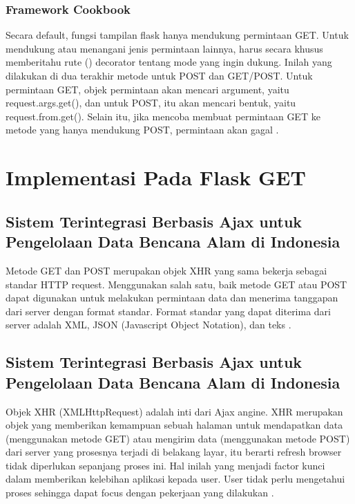 \subsubsection{Framework Cookbook}
Secara default, fungsi tampilan flask hanya mendukung permintaan GET. Untuk mendukung atau menangani jenis permintaan lainnya, harus secara khusus memberitahu rute () decorator tentang mode yang ingin dukung. Inilah yang dilakukan di dua terakhir metode untuk POST dan GET/POST. Untuk permintaan GET, objek permintaan akan mencari argument, yaitu request.args.get(), dan untuk POST, itu akan mencari bentuk, yaitu request.from.get(). Selain itu, jika mencoba membuat permintaan GET ke metode yang hanya mendukung POST, permintaan akan gagal \cite{aggarwal2014flask}.

\section{Implementasi Pada Flask GET}
\subsection{Sistem Terintegrasi Berbasis Ajax untuk Pengelolaan Data Bencana Alam di Indonesia}
Metode GET dan POST merupakan objek XHR yang sama bekerja sebagai standar HTTP request. Menggunakan salah satu, baik metode GET atau POST dapat digunakan untuk melakukan permintaan data dan menerima tanggapan dari server dengan format standar. Format standar yang dapat diterima dari server adalah XML, JSON (Javascript Object Notation), dan teks \cite{prasetyo2007sistem}.
\subsection{Sistem Terintegrasi Berbasis Ajax untuk Pengelolaan Data Bencana Alam di Indonesia}
Objek XHR (XMLHttpRequest) adalah inti dari Ajax angine. XHR merupakan objek yang memberikan kemampuan sebuah halaman untuk mendapatkan data (menggunakan metode GET) atau mengirim data (menggunakan metode POST) dari server yang prosesnya terjadi di belakang layar, itu berarti refresh browser tidak diperlukan sepanjang proses ini. Hal inilah yang menjadi factor kunci dalam memberikan kelebihan aplikasi kepada user. User tidak perlu mengetahui proses sehingga dapat focus dengan pekerjaan yang dilakukan \cite{prasetyo2007sistem}.
